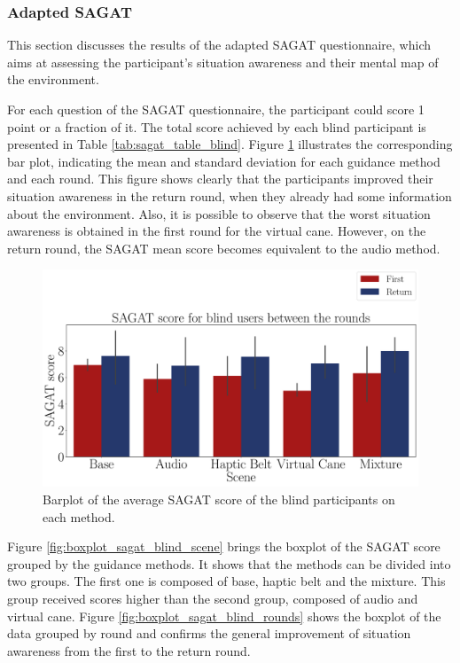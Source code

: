 \subsubsection{Adapted SAGAT}
\label{subsubsec:results_adapted_sagat_1}

This section discusses the results of the adapted SAGAT questionnaire, which aims at assessing the participant's situation awareness and their mental map of the environment. 

For each question of the SAGAT questionnaire, the participant could score 1 point or a fraction of it. The total score achieved by each blind participant is presented in Table \ref{tab:sagat_table_blind}. Figure  \ref{fig:barplot_sagat_avg_5_scene_blind} illustrates the corresponding bar plot, indicating the mean and standard deviation for each guidance method and each round. This figure shows clearly that the participants improved their situation awareness in the return round, when they already had some information about the environment. Also, it is possible to observe that the worst situation awareness is obtained in the first round for the virtual cane. However, on the return round, the SAGAT mean score becomes equivalent to the audio method.



\begin{figure}[!htb]
    \centering
    \includegraphics[width = \textwidth]{Resultados/Sagat/Figuras/pdf/barplot_sagat_avg_5_scene_blind.pdf}
    \caption{Barplot of the average SAGAT score of the blind participants on each method.}
    \label{fig:barplot_sagat_avg_5_scene_blind}
\end{figure}

Figure \ref{fig:boxplot_sagat_blind_scene} brings the boxplot of the SAGAT score grouped by the guidance methods. It shows that the methods can be divided into two groups. The first one is composed of base, haptic belt and the mixture. This group received scores higher than the second group, composed of audio and virtual cane. Figure \ref{fig:boxplot_sagat_blind_rounds} shows the boxplot of the data grouped by round and confirms the general improvement of situation awareness from the first to the return round. 

